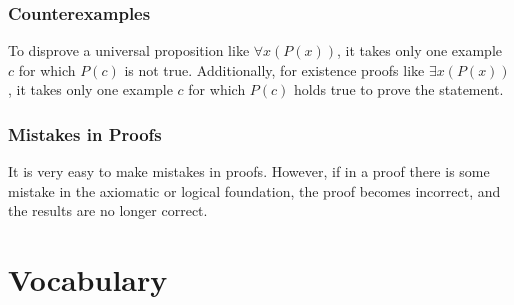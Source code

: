 \documentclass[12pt,letterpaper]{article}
\begin{document}
\subsubsection{Counterexamples}

To disprove a universal proposition like $\forall x(P(x))$, it takes only one example $c$ for which $P(c)$ is not true. Additionally, for existence proofs like $\exists x(P(x))$, it takes only one example $c$ for which $P(c)$ holds true to prove the statement.

\subsubsection{Mistakes in Proofs}

It is very easy to make mistakes in proofs. However, if in a proof there is some mistake in the axiomatic or logical foundation, the proof becomes incorrect, and the results are no longer correct. 

\pagebreak

\section{Vocabulary}
	
\end{document}
